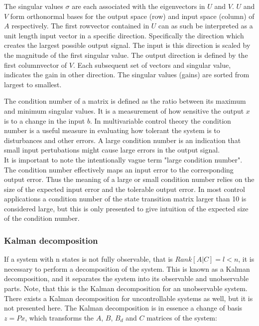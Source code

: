 The singular values $\sigma$ are each associated with the eigenvectors in $U$ and $V$. $U$ and $V$ form orthonormal bases for the output space (row) and input space (column) of $A$ respectively. The first rowvector contained in $U$ can as such be interpreted as a unit length input vector in a specific direction. Specifically the direction which creates the largest possible output signal. The input is this direction is scaled by the magnitude of the first singular value. The output direction is defined by the first columnvector of $V$. Each subsequent set of vectors and singular value, indicates the gain in other direction. The singular values (gains) are sorted from largest to smallest.

The condition number of a matrix is defined as the ratio between its maximum and minimum singular values. It is a measurement of how sensitive the output $x$ is to a change in the input $b$. In multivariable control theory the condition number is a useful measure in evaluating how tolerant the system is to disturbances and other errors. A large condition number is an indication that small input pertubations might cause large errors in the output signal.\\

It is important to note the intentionally vague term "large condition number". The condition number effectively maps an input error to the corresponding output error. Thus the meaning of a large or small condition number relies on the size of the expected input error and the tolerable output error. In most control applications a condition number of the state transition matrix larger than 10 is considered large, but this is only presented to give intuition of the expected size of the condition number.



\subsubsection{Kalman decomposition} \label{sec:kalman}
If a system with n states is not fully observable, that is $Rank[A|C] = l < n$, it is necessary to perform a decomposition of the system. This is known as a Kalman decomposition, and it separates the system into its observable and unobservable parts. Note, that this is the Kalman decomposition for an unobservable system. There exists a Kalman decomposition for uncontrollable systems as well, but it is not presented here. The Kalman decomposition is in essence a change of basis $z=Px$, which transforms the $A$, $B$, $B_d$ and $C$ matrices of the system:

